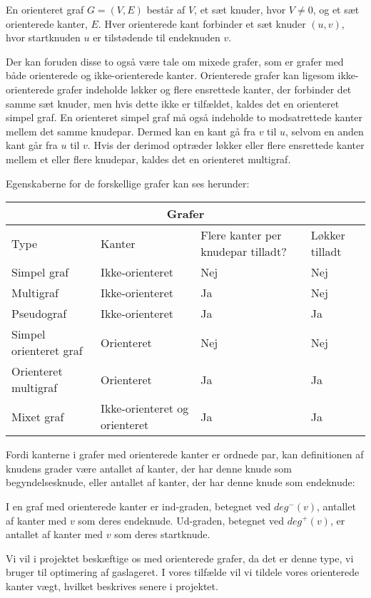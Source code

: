 \begin{defn}
En orienteret graf $G=(V,E)$ består af $V$, et sæt knuder, hvor $V\neq0$, og et sæt orienterede kanter, $E$. Hver orienterede kant forbinder et sæt knuder $(u,v)$, hvor startknuden $u$ er tilstødende til endeknuden $v$. 
\end{defn}





Der kan foruden disse to også være tale om mixede grafer, som er grafer med både orienterede og ikke-orienterede kanter. Orienterede grafer kan ligesom ikke-orienterede grafer indeholde løkker og flere ensrettede kanter, der forbinder det samme sæt knuder, men hvis dette ikke er tilfældet, kaldes det en orienteret simpel graf. En orienteret simpel graf må også indeholde to modsatrettede kanter mellem det samme knudepar. Dermed kan en kant gå fra $v$ til $u$, selvom en anden kant går fra $u$ til $v$. Hvis der derimod optræder løkker eller flere ensrettede kanter mellem et eller flere knudepar, kaldes det en orienteret multigraf.  

Egenskaberne for de forskellige grafer kan ses herunder:

\begin{tabular}{ |p{4cm}||p{3cm}|p{3cm}|p{2cm}|  }
 \hline
 \multicolumn{4}{|c|}{Grafer} \\
 \hline
 Type & Kanter & Flere kanter per knudepar tilladt? & Løkker tilladt\\
 \hline
 Simpel graf   & Ikke-orienteret    & Nej &   Nej\\
 Multigraf &   Ikke-orienteret & Ja   & Nej\\
 Pseudograf & Ikke-orienteret & Ja &  Ja\\
 Simpel orienteret graf    & Orienteret & Nej &  Nej\\
 Orienteret multigraf &  Orienteret  & Ja & Ja\\
 Mixet graf & Ikke-orienteret og orienteret  & Ja   & Ja\\
 \hline
\end{tabular}

Fordi kanterne i grafer med orienterede kanter er ordnede par, kan definitionen af knudens grader være antallet af kanter, der har denne knude som begyndelsesknude, eller antallet af kanter, der har denne knude som endeknude:
\begin{defn}
I en graf med orienterede kanter er ind-graden, betegnet ved $deg^{-}(v)$, antallet af kanter med $v$ som deres endeknude. Ud-graden, betegnet ved $deg^{+}(v)$, er antallet af kanter med $v$ som deres startknude.
\end{defn}
Vi vil i projektet beskæftige os med orienterede grafer, da det er denne type, vi bruger til optimering af gaslageret. I vores tilfælde vil vi tildele vores orienterede kanter vægt, hvilket beskrives senere i projektet.
